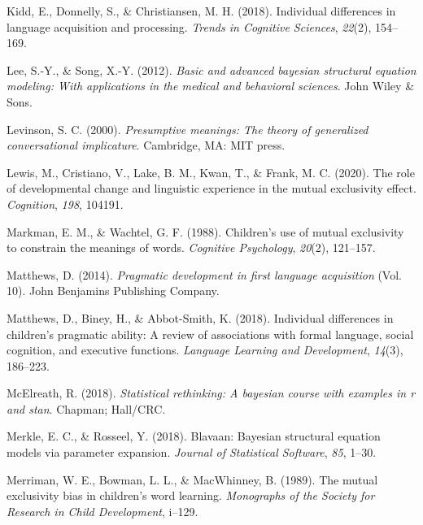 \documentclass[
  english,
  man,floatsintext]{apa6}
\newlength{\cslhangindent}
\newlength{\cslentryspacingunit} %
\newenvironment{CSLReferences}[2] %
 {%
  \setlength{\parindent}{0pt}
  \ifodd #1
  \let\oldpar\par
  \def\par{\hangindent=\cslhangindent\oldpar}
  \fi
  \setlength{\parskip}{#2\cslentryspacingunit}
 }%
 {}
\begin{document}
\begin{CSLReferences}{1}{0}
\leavevmode{}%
Kidd, E., Donnelly, S., \& Christiansen, M. H. (2018). Individual differences in language acquisition and processing. \emph{Trends in Cognitive Sciences}, \emph{22}(2), 154--169.

\leavevmode{}%
Lee, S.-Y., \& Song, X.-Y. (2012). \emph{Basic and advanced bayesian structural equation modeling: With applications in the medical and behavioral sciences}. John Wiley \& Sons.

\leavevmode{}%
Levinson, S. C. (2000). \emph{Presumptive meanings: The theory of generalized conversational implicature}. Cambridge, MA: MIT press.

\leavevmode{}%
Lewis, M., Cristiano, V., Lake, B. M., Kwan, T., \& Frank, M. C. (2020). The role of developmental change and linguistic experience in the mutual exclusivity effect. \emph{Cognition}, \emph{198}, 104191.

\leavevmode{}%
Markman, E. M., \& Wachtel, G. F. (1988). Children's use of mutual exclusivity to constrain the meanings of words. \emph{Cognitive Psychology}, \emph{20}(2), 121--157.

\leavevmode{}%
Matthews, D. (2014). \emph{Pragmatic development in first language acquisition} (Vol. 10). John Benjamins Publishing Company.

\leavevmode{}%
Matthews, D., Biney, H., \& Abbot-Smith, K. (2018). Individual differences in children's pragmatic ability: A review of associations with formal language, social cognition, and executive functions. \emph{Language Learning and Development}, \emph{14}(3), 186--223.

\leavevmode{}%
McElreath, R. (2018). \emph{Statistical rethinking: A bayesian course with examples in r and stan}. Chapman; Hall/CRC.

\leavevmode{}%
Merkle, E. C., \& Rosseel, Y. (2018). Blavaan: Bayesian structural equation models via parameter expansion. \emph{Journal of Statistical Software}, \emph{85}, 1--30.

\leavevmode{}%
Merriman, W. E., Bowman, L. L., \& MacWhinney, B. (1989). The mutual exclusivity bias in children's word learning. \emph{Monographs of the Society for Research in Child Development}, i--129.


\end{CSLReferences}
\end{document}
